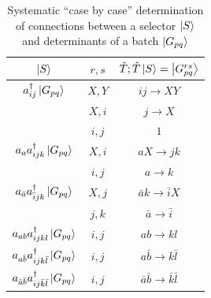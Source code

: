 \documentclass[./thesis.tex]{subfiles}
\begin{document}
\begin{table}

\caption{Systematic ``case by case'' determination of connections between a selector $\ket S$ and determinants of a batch $\ket {G_{pq}}$} 
\label{tab:systematic_determination}
\begin{center}
        \begin{tabular}{ c|c|c }
                \hline \hline \rule{0pt}{3ex}
                $\ket S$                                                                        &$ r, s$        & $\hat T ; \hat T \ket S = \ket{G^{rs}_{pq}}$     \\
                \hline \hline \rule{0pt}{3ex}
                $a^\dagger_{ij} \ket {G_{pq}}$                                         & $X,Y$         &$ij \rightarrow XY$            \\
                                                                                        & $X,i$         &$j \rightarrow X$              \\
                                                                                        & $i,j$         &$1$                    \\
                \hline \rule{0pt}{3ex}
                $a_{a} a^\dagger_{ijk} \ket {G_{pq}}$                          &$X,i$          &$aX \rightarrow jk$            \\
                                                                                        &$i,j$          &$a \rightarrow k$              \\
                \hline \rule{0pt}{3ex}
                $a_{\bar a} a^\dagger_{\bar i jk} \ket {G_{pq}}$     &$X,j$          &$\bar a k \rightarrow \bar i X$                \\
                                                                                        &$j,k$          &$\bar a \rightarrow \bar i$            \\
                \hline \rule{0pt}{3ex}
                $a_{ab} a^\dagger_{ijkl} \ket {G_{pq}}$                      &$i,j$          &$ab \rightarrow kl$            \\
                \hline \rule{0pt}{3ex}
                $a_{a  \bar b} a^\dagger_{ijk \bar l} \ket {G_{pq}}$                 &$i,j$          &$a \bar b \rightarrow k \bar l$                \\
                \hline \rule{0pt}{3ex}
                $a_{\bar a \bar b} a^\dagger_{i j \bar k \bar l} \ket {G_{pq}}$      &$i,j$          &$\bar a \bar b \rightarrow \bar k \bar l$              \\
                

\end{tabular}
\end{center}
\end{table}
\end{document}
